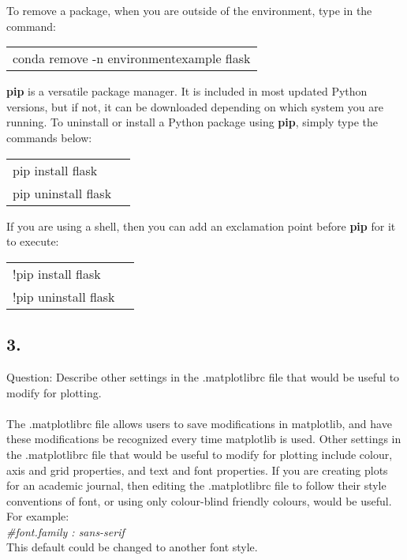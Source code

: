 \documentclass[12pt, letterpaper]{article}
\begin{document}
To remove a package, when you are outside of the environment, type in the command: 
\begin{center}
\begin{tabular}{ l }
 conda remove -n environmentexample flask \\ 
\end{tabular}
\end{center} 

\textbf{pip} is a versatile package manager. It is included in most updated Python versions, but if not, it can be downloaded depending on which system you are running. To uninstall or install a Python package using \textbf{pip}, simply type the commands below: 
\begin{center}
\begin{tabular}{ l l }
 pip install flask \\ 
 pip uninstall flask \\  
\end{tabular}
\end{center}

If you are using a shell, then you can add an exclamation point before \textbf{pip} for it to execute:
\begin{center}
\begin{tabular}{ l l }
 !pip install flask \\ 
 !pip uninstall flask \\  
\end{tabular}
\end{center}
\subsection*{   3.}
Question: Describe other settings in
the .matplotlibrc file that would be useful to modify for plotting.\\
\\
The .matplotlibrc file allows users to save modifications in matplotlib, and have these modifications be recognized every time matplotlib is used. Other settings in the .matplotlibrc file that would be useful to modify for plotting include colour, axis and grid properties, and text and font properties. If you are creating plots for an academic journal, then editing the .matplotlibrc file to follow their style conventions of font, or using only colour-blind friendly colours, would be useful.\\
For example:\\
\textit{\#font.family  : sans-serif}\\
This default could be changed to another font style. 
\end{document}
